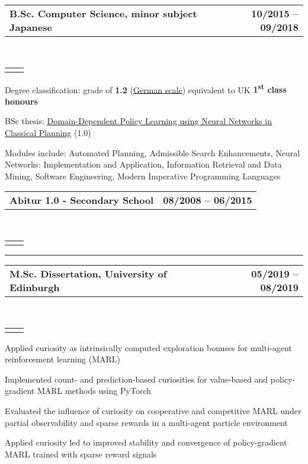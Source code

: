 \documentclass[]{lukas-cv-openfont}
\makeatletter
\newcommand{\headerrow}[2]
{\begin{tabular*}{\linewidth}{l@{\extracolsep{\fill}}r}
	\fontspec{Helvetica}\fontsize{12pt}{12pt}\selectfont\bfseries{\color{subheadings}#1} &
	\fontspec{Helvetica}\fontsize{12pt}{12pt}\selectfont\bfseries{\color{subheadings}#2} \\
\end{tabular*}}
\newcommand{\locationrow}[2]
{\begin{tabular*}{\linewidth}{l@{\extracolsep{\fill}}r}
        \color{headings}\scshape\fontspec{Heiti TC Medium}\fontsize{10pt}{12pt}\selectfont{#1}  &
        \color{headings}\scshape\fontspec{Heiti TC Medium}\fontsize{10pt}{12pt}\selectfont{#2}  \\
\end{tabular*}}
\makeatother
\begin{document}
\noindent
\headerrow{B.Sc. Computer Science, minor subject Japanese}{10/2015 -- 09/2018}
\\
\locationrow{Saarland University}{Saarbrücken, Germany}
\begin{tightitemize}{1.7em}
    \item Degree classification: grade of \textbf{1.2} (\href{https://en.wikipedia.org/wiki/Academic_grading_in_Germany}{German scale}) equivalent to UK \textbf{1\textsuperscript{st} class honours}
    \item BSc thesis: \href{https://www.lukaschaefer.de/assets/files/bsc_thesis.pdf}{Domain-Dependent Policy Learning using Neural Networks in Classical Planning} (1.0)
    \item Modules include: Automated Planning, Admissible Search Enhancements, Neural Networks: Implementation and Application, Information Retrieval and Data Mining, Software Engineering, Modern Imperative Programming Languages
\end{tightitemize}
\largesectionsep

\noindent
\headerrow{Abitur 1.0 - Secondary School}{08/2008 -- 06/2015}
\\
\locationrow{Warndtgymnasium Geislautern, Völklingen}{Geislautern, Germany}
\largesectionsep


\hrule
\vspace{0.4em}

\noindent
\headerrow{M.Sc. Dissertation, University of Edinburgh}{05/2019 -- 08/2019}
\\
\locationrow{Autonomous Agents Research Group}{}
\begin{tightitemize}{1.7em}
    \item Applied curiosity as intrinsically computed exploration bonuses for multi-agent reinforcement learning (MARL)
    \item Implemented count- and prediction-based curiosities for value-based and policy-gradient MARL methods using PyTorch
    \item Evaluated the influence of curiosity on cooperative and competitive MARL under partial observability and sparse rewards in a multi-agent particle environment
    \item Applied curiosity led to improved stability and convergence of policy-gradient MARL trained with sparse reward signals
\end{tightitemize}
\largesectionsep
\end{document}
